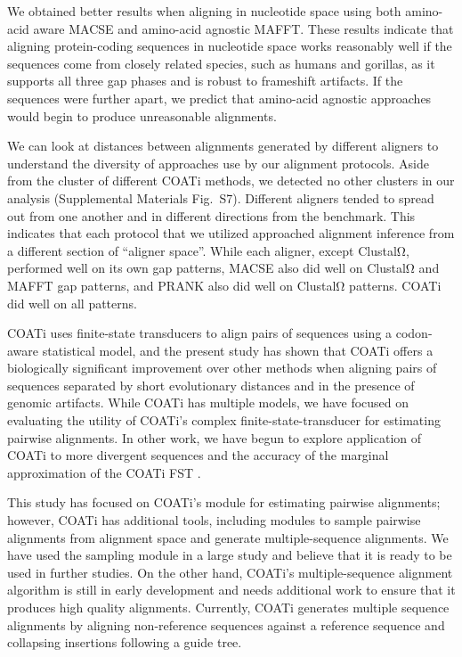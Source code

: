 \documentclass[12pt,letterpaper]{article}
\begin{document}
We obtained better results when aligning in nucleotide space using both amino-acid aware MACSE and amino-acid agnostic MAFFT. These results indicate that aligning protein-coding sequences in nucleotide space works reasonably well if the sequences come from closely related species, such as humans and gorillas, as it supports all three gap phases and is robust to frameshift artifacts. If the sequences were further apart, we predict that amino-acid agnostic approaches would begin to produce unreasonable alignments. 

We can look at distances between alignments generated by different aligners to understand the diversity of approaches use by our alignment protocols. Aside from the cluster of different COATi methods, we detected no other clusters in our analysis (Supplemental Materials Fig.~S7). Different aligners tended to spread out from one another and in different directions from the benchmark. This indicates that each protocol that we utilized approached alignment inference from a different section of ``aligner space''. While each aligner, except ClustalΩ, performed well on its own gap patterns, MACSE also did well on ClustalΩ and MAFFT gap patterns, and PRANK also did well on ClustalΩ patterns. COATi did well on all patterns.

COATi uses finite-state transducers to align pairs of sequences using a codon-aware statistical model, and the present study has shown that COATi offers a biologically significant improvement over other methods when aligning pairs of sequences separated by short evolutionary distances and in the presence of genomic artifacts. While COATi has multiple models, we have focused on evaluating the utility of COATi's complex finite-state-transducer for estimating pairwise alignments. In other work, we have begun to explore application of COATi to more divergent sequences and the accuracy of the marginal approximation of the COATi FST \citep{garcia2023dissertation}.

This study has focused on COATi's module for estimating pairwise alignments; however, COATi has additional tools, including modules to sample pairwise alignments from alignment space and generate multiple-sequence alignments. We have used the sampling module in a large study \citep{zhu2022profiling} and believe that it is ready to be used in further studies. On the other hand, COATi's multiple-sequence alignment algorithm is still in early development and needs additional work to ensure that it produces high quality alignments. Currently, COATi generates multiple sequence alignments by aligning non-reference sequences against a reference sequence and collapsing insertions following a guide tree.
\end{document}
